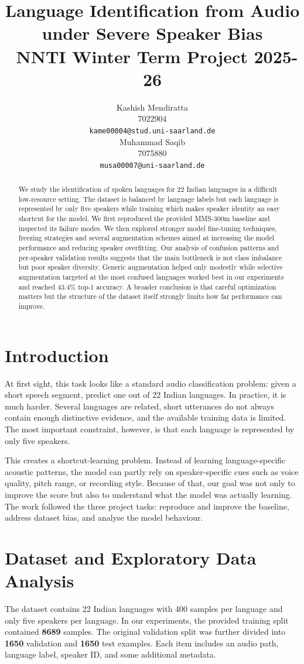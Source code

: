 \documentclass[11pt]{article}
\title{Language Identification from Audio under Severe Speaker Bias\\
 \ NNTI Winter Term Project 2025-26
}
\author{Kashish Mendiratta \\
    7022904 \\
  \texttt{kame00004@stud.uni-saarland.de} \\\And
  Muhammad Saqib \\
  7075880 \\
  \texttt{musa00007@uni-saarland.de} \\}
\begin{document}
\maketitle

\begin{abstract}
We study the identification of spoken languages for 22 Indian languages in a difficult low-resource setting. The dataset is balanced by language labels but each language is represented by only five speakers while training which makes speaker identity an easy shortcut for the model. We first reproduced the provided MMS-300m baseline and inspected its failure modes. We then explored stronger model fine-tuning techniques, freezing strategies and several augmentation schemes aimed at increasing the model performance and reducing speaker overfitting. Our analysis of confusion patterns and per-speaker validation results suggests that the main bottleneck is not class imbalance but poor speaker diversity. Generic augmentation helped only modestly while selective augmentation targeted at the most confused languages worked best in our experiments and reached 43.4\% top-1 accuracy. A broader conclusion is that careful optimization matters but the structure of the dataset itself strongly limits how far performance can improve.
\end{abstract}

\section{Introduction}
At first sight, this task looks like a standard audio classification problem: given a short speech segment, predict one out of 22 Indian languages. In practice, it is much harder. Several languages are related, short utterances do not always contain enough distinctive evidence, and the available training data is limited. The most important constraint, however, is that each language is represented by only five speakers.

This creates a shortcut-learning problem. Instead of learning language-specific acoustic patterns, the model can partly rely on speaker-specific cues such as voice quality, pitch range, or recording style. Because of that, our goal was not only to improve the score but also to understand what the model was actually learning. The work followed the three project tasks: reproduce and improve the baseline, address dataset bias, and analyse the model behaviour.

\section{Dataset and Exploratory Data Analysis}
The dataset contains 22 Indian languages with 400 samples per language and only five speakers per language. In our experiments, the provided training split contained \textbf{8689} samples. The original validation split was further divided into \textbf{1650} validation and \textbf{1650} test examples. Each item includes an audio path, language label, speaker ID, and some additional metadata.
\end{document}
